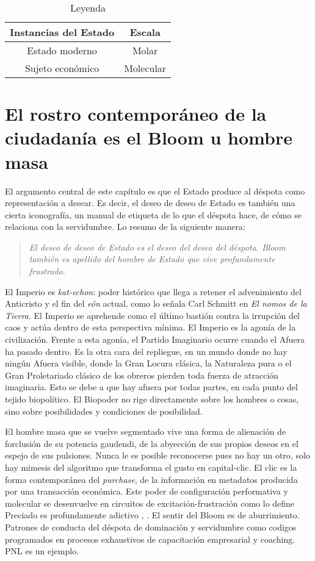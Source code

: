 \begin{table}[htb]
  \caption{Leyenda}
  \label{tab:tablename}
  \centering
  \begin{tabular}{cc}
    \toprule
    \textbf{Instancias del Estado} & \textbf{Escala}\tabularnewline
    \midrule
    Estado moderno & Molar\tabularnewline
    Sujeto económico & Molecular\tabularnewline
    \bottomrule
  \end{tabular}
\end{table}

\section{El rostro contemporáneo de la ciudadanía es el Bloom u hombre masa}
\label{sec:el-rostro-contemporáneo}

El argumento central de este capítulo es que el Estado produce al déspota como representación a desear. Es decir, el deseo de deseo de Estado es también una cierta iconografía, un manual de etiqueta de lo que el déspota hace, de cómo se relaciona con la servidumbre. Lo resumo de la siguiente manera:

\begin{quote}
  \emph{El deseo de deseo de Estado es el deseo del deseo del déspota. Bloom también es apellido del hombre de Estado que vive profundamente frustrado.}
\end{quote}

El Imperio es \emph{kat-echon}: poder histórico que llega a retener el advenimiento del Anticristo y el fin del \emph{eón} actual, como lo señala Carl Schmitt en \emph{El nomos de la Tierra}. El Imperio se aprehende como el último bastión contra la irrupción del caos y actúa dentro de esta perspectiva mínima. El Imperio es la agonía de la civilización. Frente a esta agonía, el Partido Imaginario ocurre cuando el Afuera ha pasado dentro. Es la otra cara del repliegue, en un mundo donde no hay ningún Afuera visible, donde la Gran Locura clásica, la Naturaleza pura o el Gran Proletariado clásico de los obreros pierden toda fuerza de atracción imaginaria. Esto se debe a que hay afuera por todas partes, en cada punto del tejido biopolítico. El Biopoder no rige directamente sobre los hombres o cosas, sino sobre posibilidades y condiciones de posibilidad.

El hombre masa que se vuelve segmentado vive una forma de alienación de forclusión de su potencia gaudendi, de la abyección de sus propios deseos en el espejo de sus pulsiones. Nunca le es posible reconocerse pues no hay un otro, solo hay mimesis del algoritmo que transforma el gusto en capital-clic. El clic es la forma contemporánea del \emph{purchase}, de la información en metadatos producida por una transacción económica. Este poder de configuración performativa y molecular se desenvuelve en circuitos de excitación-frustración como lo define Preciado es profundamente adictivo \autocite{preciadoTestoYonqui2008}, \autocite{anderssonSocialMediaDeliberately2018}. El sentir del Bloom es de aburrimiento. Patrones de conducta del déspota de dominación y servidumbre como codigos programados en procesos exhaustivos de capacitación empresarial y coaching. PNL es un ejemplo.

